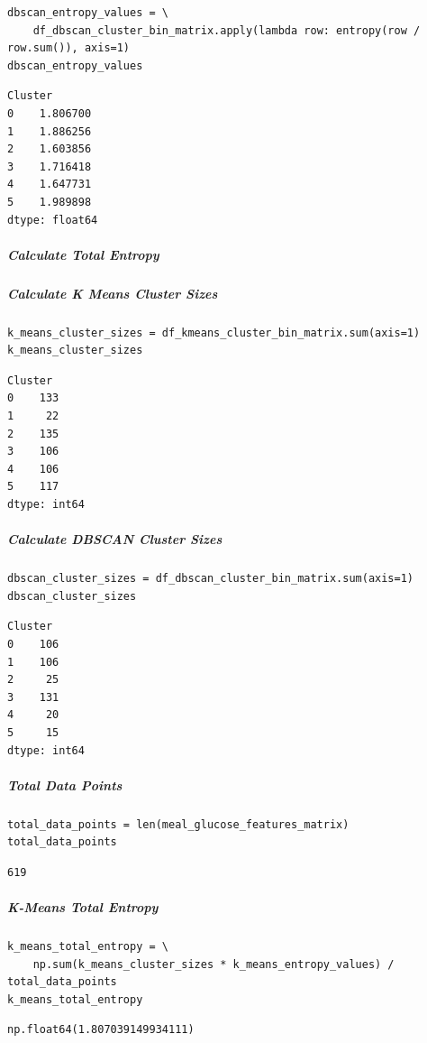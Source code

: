 \begin{verbatim}
dbscan_entropy_values = \
    df_dbscan_cluster_bin_matrix.apply(lambda row: entropy(row / row.sum()), axis=1)
dbscan_entropy_values
\end{verbatim}

\begin{verbatim}
Cluster
0    1.806700
1    1.886256
2    1.603856
3    1.716418
4    1.647731
5    1.989898
dtype: float64
\end{verbatim}

\subparagraph{Calculate Total Entropy}

\subparagraph{Calculate K Means Cluster Sizes}

\begin{verbatim}
k_means_cluster_sizes = df_kmeans_cluster_bin_matrix.sum(axis=1)
k_means_cluster_sizes
\end{verbatim}

\begin{verbatim}
Cluster
0    133
1     22
2    135
3    106
4    106
5    117
dtype: int64
\end{verbatim}

\subparagraph{Calculate DBSCAN Cluster Sizes}

\begin{verbatim}
dbscan_cluster_sizes = df_dbscan_cluster_bin_matrix.sum(axis=1)
dbscan_cluster_sizes
\end{verbatim}

\begin{verbatim}
Cluster
0    106
1    106
2     25
3    131
4     20
5     15
dtype: int64
\end{verbatim}

\subparagraph{Total Data Points}

\begin{verbatim}
total_data_points = len(meal_glucose_features_matrix)
total_data_points
\end{verbatim}

\begin{verbatim}
619
\end{verbatim}

\subparagraph{K-Means Total Entropy}

\begin{verbatim}
k_means_total_entropy = \
    np.sum(k_means_cluster_sizes * k_means_entropy_values) / total_data_points
k_means_total_entropy
\end{verbatim}

\begin{verbatim}
np.float64(1.807039149934111)
\end{verbatim}

